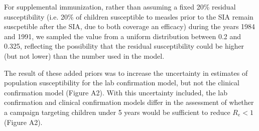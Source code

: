 For supplemental immunization, rather than assuming a fixed 20\% residual susceptibility (i.e. 20\% of children susceptible to measles prior to the SIA remain suscpetible after the SIA, due to both coverage an efficacy) during the years 1984 and 1991, we sampled the value from a uniform distribution between 0.2 and 0.325, reflecting the possibility that the residual susceptibility could be higher (but not lower) than the number used in the model.

The result of these added priors was to increase the uncertainty in estimates of population susceptibility for the lab confirmation model, but not the clinical confirmation model (Figure A2). With this uncertainty included, the lab confirmation and clinical confirmation models differ in the assessment of whether a campaign targeting children under 5 years would be sufficient to reduce $R_e < 1$ (Figure A2). 